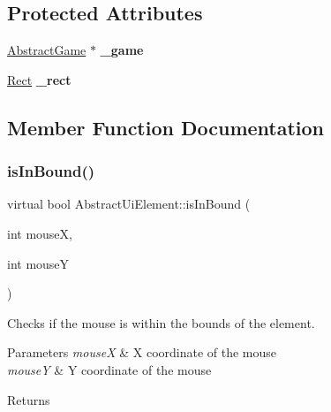 \subsection*{Protected Attributes}
\begin{DoxyCompactItemize}
\item 
\mbox{\label{class_abstract_ui_element_ad80a25aa84eb844afd1c5e091063e8fb}} 
\mbox{\hyperlink{class_abstract_game}{Abstract\+Game}} $\ast$ {\bfseries \+\_\+game}
\item 
\mbox{\label{class_abstract_ui_element_a4017d556668e164cd2f34a975db3d924}} 
\mbox{\hyperlink{struct_rect}{Rect}} {\bfseries \+\_\+rect}
\end{DoxyCompactItemize}


\subsection{Member Function Documentation}
\mbox{\label{class_abstract_ui_element_ad2c415461cd7e8c1ee50b1105eb84685}} 
\subsubsection{\texorpdfstring{is\+In\+Bound()}{isInBound()}}
{\footnotesize\ttfamily virtual bool Abstract\+Ui\+Element\+::is\+In\+Bound (\begin{DoxyParamCaption}\item[{int}]{mouseX,  }\item[{int}]{mouseY }\end{DoxyParamCaption})\hspace{0.3cm}{\ttfamily [pure virtual]}}



Checks if the mouse is within the bounds of the element. 


\begin{DoxyParams}{Parameters}
{\em mouseX} & X coordinate of the mouse\\
\hline
{\em mouseY} & Y coordinate of the mouse\\
\hline
\end{DoxyParams}
\begin{DoxyReturn}{Returns}

\end{DoxyReturn}


